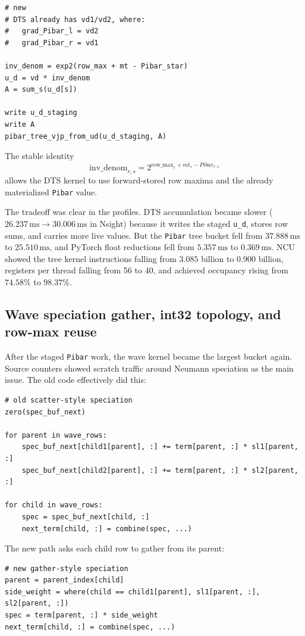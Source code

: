 \documentclass[11pt]{article}
\newcommand{\ms}{\,\mathrm{ms}}
\newcommand{\code}[1]{\texttt{#1}}
\begin{document}
\begin{lstlisting}
# new
# DTS already has vd1/vd2, where:
#   grad_Pibar_l = vd2
#   grad_Pibar_r = vd1

inv_denom = exp2(row_max + mt - Pibar_star)
u_d = vd * inv_denom
A = sum_s(u_d[s])

write u_d_staging
write A
pibar_tree_vjp_from_ud(u_d_staging, A)
\end{lstlisting}

The stable identity
\[
  \mathrm{inv\_denom}_{r,s}
    = 2^{\mathrm{row\_max}_r + mt_s - Pibar_{r,s}}
\]
allows the DTS kernel to use forward-stored row maxima and the already
materialized \code{Pibar} value.

The tradeoff was clear in the profiles.  DTS accumulation became slower
($26.237\ms \to 30.006\ms$ in Nsight) because it writes the staged \code{u\_d},
stores row sums, and carries more live values.  But the \code{Pibar} tree bucket
fell from $37.888\ms$ to $25.510\ms$, and PyTorch float reductions fell from
$5.357\ms$ to $0.369\ms$.  NCU showed the tree kernel instructions falling from
$3.085$ billion to $0.900$ billion, registers per thread falling from 56 to 40,
and achieved occupancy rising from $74.58\%$ to $98.37\%$.

\subsection{Wave speciation gather, int32 topology, and row-max reuse}

After the staged \code{Pibar} work, the wave kernel became the largest bucket
again.  Source counters showed scratch traffic around Neumann speciation as the
main issue.  The old code effectively did this:

\begin{lstlisting}
# old scatter-style speciation
zero(spec_buf_next)

for parent in wave_rows:
    spec_buf_next[child1[parent], :] += term[parent, :] * sl1[parent, :]
    spec_buf_next[child2[parent], :] += term[parent, :] * sl2[parent, :]

for child in wave_rows:
    spec = spec_buf_next[child, :]
    next_term[child, :] = combine(spec, ...)
\end{lstlisting}

The new path asks each child row to gather from its parent:

\begin{lstlisting}
# new gather-style speciation
parent = parent_index[child]
side_weight = where(child == child1[parent], sl1[parent, :], sl2[parent, :])
spec = term[parent, :] * side_weight
next_term[child, :] = combine(spec, ...)
\end{lstlisting}
\end{document}
